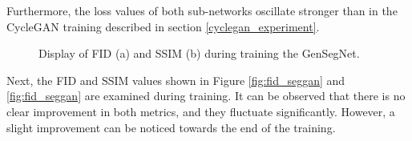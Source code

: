Furthermore, the loss values of both sub-networks oscillate stronger than in the CycleGAN training described in section \ref{cyclegan_experiment}.\\
\begin{figure}[bt]
    \centering
    \hfill
    \caption[FID and SSIM in GenSegNet]{Display of FID (a) and SSIM (b) during training the GenSegNet.}\label{fig:fid_ssim_genseg}
\end{figure}
Next, the FID and SSIM values shown in Figure \ref{fig:fid_seggan} and \ref{fig:fid_seggan} are examined during training. 
It can be observed that there is no clear improvement in both metrics, and they fluctuate significantly.
However, a slight improvement can be noticed towards the end of the training.\\

